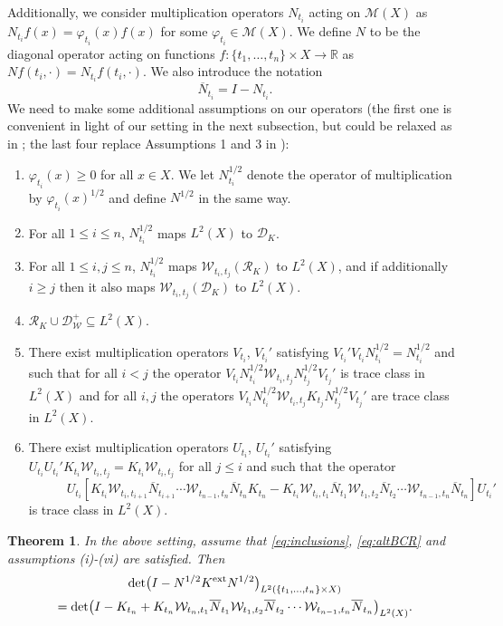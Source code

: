 \documentclass[letterpaper,reqno,11pt,oneside,final]{amsart}
\newtheorem{theorem}[thm]{Theorem}
\theoremstyle{definition}
\newcommand{\rr}{\mathbb{R}}
\newcommand{\cD}{\mathcal{D}}
\newcommand{\cR}{\mathcal{R}}
\newcommand{\cm}{\mathcal{M}}
\newcommand{\uptext}[1]{\text{\upshape{#1}}}
\newcommand{\cw}{\mathcal{W}}
\newcommand{\Ml}{N}
\newcommand{\oM}{\overline{\Ml}}
\numberwithin{equation}{section}
\begin{document}
Additionally, we consider multiplication operators $\Ml_{t_i}$ acting on $\cm(X)$ as $\Ml_{t_i}f(x)=\varphi_{t_i}(x)f(x)$ for some $\varphi_{t_i}\in\cm(X)$.
We define $N$ to be the diagonal operator acting on functions $f\!:\{t_1,\dotsc,t_n\}\!\times\!X\longrightarrow\rr$ as $Nf(t_i,\cdot)=\Ml_{t_i}f(t_i,\cdot)$.
We also introduce the notation
\[\oM_{t_i}=I-\Ml_{t_i}.\]
We need to make some additional assumptions on our operators (the first one is convenient in light of our setting in the next subsection, but could be relaxed as in \cite{bcr}; the last four replace Assumptions 1 and 3 in \cite[Thm. 3.3]{bcr}):
\begin{enumerate}[label=(\roman*)]
\item $\varphi_{t_i}(x)\geq0$ for all $x\in X$.
We let $\Ml_{t_i}^{1/2}$ denote the operator of multiplication by $\varphi_{t_i}(x)^{1/2}$ and define $N^{1/2}$ in the same way.
\item For all $1\leq i\leq n$, $N_{t_i}^{1/2}$ maps $L^2(X)$ to $\cD_K$.
\item For all $1\leq i,j\leq n$, $N_{t_i}^{1/2}$ maps $\cw_{t_i,t_j}(\cR_K)$ to $L^2(X)$, and if additionally $i\geq j$ then it also maps $\cw_{t_i,t_j}(\cD_K)$ to $L^2(X)$.
\item $\cR_K\cup\cD_\cw^+\subseteq L^2(X)$.
\item There exist multiplication operators $V_{t_i}$, $V_{t_i}'$ satisfying $V_{t_i}'V_{t_i}N_{t_i}^{1/2}=N_{t_i}^{1/2}$ and such that for all $i<j$ the operator $V_{t_i}N_{t_i}^{1/2}\cw_{t_i,t_j}N_{t_j}^{1/2}V_{t_j}'$ is trace class in $L^2(X)$ and for all $i,j$ the operators $V_{t_i}N_{t_i}^{1/2}\cw_{t_i,t_j}K_{t_j}N_{t_j}^{1/2}V_{t_j}'$ are trace  class in $L^2(X)$.
\item There exist multiplication operators $U_{t_i}$, $U_{t_i}'$ satisfying $U_{t_i}U_{t_i}'K_{t_i}\cw_{t_i,t_j}=K_{t_i}\cw_{t_i,t_j}$ for all $j\leq i$ and such that the operator 
\[\mbox{}\qquad\quad U_{t_i}\!\left[K_{t_i}\cw_{t_{i},t_{i+1}}\oM_{t_{i+1}}
    \dotsm\cw_{{t_{n-1}},{t_{n}}}\oM_{{t_{n}}}K_{t_n}-K_{t_i}\cw_{t_{i},{t_1}}\oM_{{t_1}}\cw_{{t_1},{t_2}}\oM_{{t_2}}\dotsm\cw_{{t_{n-1}},{t_{n}}}\oM_{{t_{n}}}\right]\!U_{t_i}'\]
 is trace class in $L^2(X)$.
\end{enumerate}

\begin{theorem}\label{thm:alt-extendedToBVP}
  In the above setting, assume that \eqref{eq:inclusions}, \eqref{eq:altBCR} and assumptions (i)-(vi) are satisfied.
  Then
  \begin{multline}\label{eq:extToBVP}
    \det\!\big(I-\Ml^{1/2} K^\uptext{ext}\Ml^{1/2}\big)_{L^2(\{t_1,\dots,t_n\}\times X)}\\
    =\det\!\big(I-K_{t_n}+K_{t_n}\cw_{t_n,t_1}\oM_{t_1}\cw_{t_1,t_2}\oM_{t_2}\dotsm\cw_{t_{n-1},t_n}\oM_{t_n}\big)_{L^2(X)}.
  \end{multline}
\end{theorem}
\end{document}
